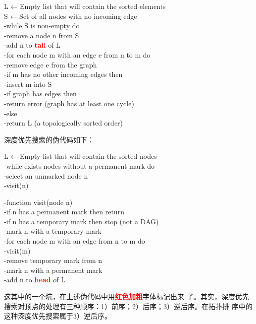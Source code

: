 \documentclass[12pt, a4paper]{article}
\begin{document}
\begin{tcolorbox}
  L ← Empty list that will contain the sorted elements\\
  S ← Set of all nodes with no incoming edge\\
  -while S is non-empty do\\
  -\quad remove a node n from S\\
  -\quad add n to \textcolor{red}{\textbf{tail}} of L\\
  -\quad for each node m with an edge e from n to m do\\
  -\quad \quad remove edge e from the graph\\
  -\quad \quad if m has no other incoming edges then\\
  -\quad \quad \quad insert m into S\\
  -if graph has edges then\\
  -\quad return error   (graph has at least one cycle)\\
  -else\\
  -\quad return L   (a topologically sorted order)
\end{tcolorbox}

深度优先搜索的伪代码如下：
\begin{tcolorbox}
  L ← Empty list that will contain the sorted nodes\\
  -while exists nodes without a permanent mark do\\
  -\quad select an unmarked node n\\
  -\quad visit(n)
\end{tcolorbox}

\begin{tcolorbox}
  -function visit(node n)\\
  -\quad if n has a permanent mark then return\\
  -\quad if n has a temporary mark then stop   (not a DAG)\\
  -\quad mark n with a temporary mark\\
  -\quad for each node m with an edge from n to m do\\
  -\quad \quad visit(m)\\
  -\quad remove temporary mark from n\\
  -\quad mark n with a permanent mark\\
  -\quad add n to \textcolor{red}{\textbf{head}} of L
\end{tcolorbox}
这其中的一个坑，在上述伪代码中用\textcolor{red}{\textbf{红色加粗}}字体标记出来
了。其实，深度优先搜索对顶点的处理有三种顺序：1）前序；2）后序；3）逆后序。在拓扑排
序中的这种深度优先搜索属于3）逆后序。
\end{document}
